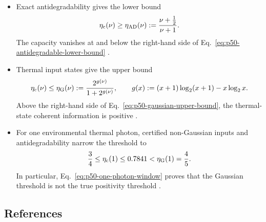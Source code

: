 \begin{itemize}
  \item Exact antidegradability gives the lower bound
  \begin{equation}
    \eta_{\rm c}(\nu)\geq\eta_{\rm AD}(\nu)
    :=\frac{\nu+\frac12}{\nu+1}.
    \label{eq:p50-antidegradable-lower-bound}
  \end{equation}
  The capacity vanishes at and below the right-hand side of
  Eq.~\eqref{eq:p50-antidegradable-lower-bound}
  .

  \item Thermal input states give the upper bound
  \begin{equation}
    \eta_{\rm c}(\nu)\leq\eta_{\rm G}(\nu)
    :=\frac{2^{g(\nu)}}{1+2^{g(\nu)}},
    \qquad
    g(x):=(x+1)\log_2(x+1)-x\log_2x.
    \label{eq:p50-gaussian-upper-bound}
  \end{equation}
  Above the right-hand side of Eq.~\eqref{eq:p50-gaussian-upper-bound}, the
  thermal-state coherent information is positive
  .

  \item For one environmental thermal photon, certified non-Gaussian inputs
  and antidegradability narrow the threshold to
  \begin{equation}
    \frac34\leq\eta_{\rm c}(1)\leq0.7841
    <\eta_{\rm G}(1)=\frac45.
    \label{eq:p50-one-photon-window}
  \end{equation}
  In particular, Eq.~\eqref{eq:p50-one-photon-window} proves that the Gaussian
  threshold is not the true positivity threshold
  .
\end{itemize}

\subsection*{References}

